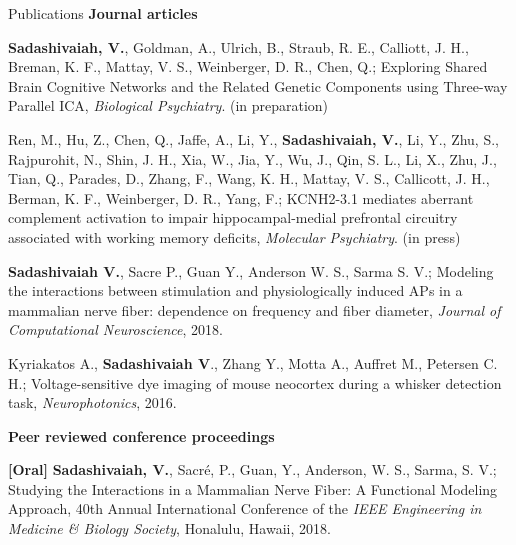 \documentclass{resume}
\begin{document}
\vspace{1em} 
\begin{rSection}{Publications}
\textbf{\Large Journal articles}
\begin{publications}
 
\item \textbf{Sadashivaiah, V.}, Goldman, A., Ulrich, B., Straub, R. E., Calliott, J. H., Breman, K. F., Mattay, V. S., Weinberger, D. R., Chen, Q.; Exploring Shared Brain Cognitive Networks and the Related Genetic Components using Three-way Parallel ICA, \textit{Biological Psychiatry}. (in preparation) 

\item Ren, M., Hu, Z., Chen, Q., Jaffe, A., Li, Y., \textbf{Sadashivaiah, V.}, Li, Y., Zhu, S., Rajpurohit, N., Shin, J. H., Xia, W., Jia, Y., Wu, J., Qin, S. L., Li, X., Zhu, J., Tian, Q., Parades, D., Zhang, F., Wang, K. H., Mattay, V. S., Callicott, J. H., Berman, K. F., Weinberger, D. R., Yang, F.; KCNH2-3.1 mediates aberrant complement activation to impair hippocampal-medial prefrontal circuitry associated with working memory deficits, \textit{Molecular Psychiatry}. (in press)

\item \textbf{Sadashivaiah V.}, Sacre P., Guan Y., Anderson W. S., Sarma S. V.; Modeling the interactions between stimulation and physiologically induced APs in a mammalian nerve fiber: dependence on frequency and fiber diameter, \textit{Journal of Computational Neuroscience}, 2018.

\item Kyriakatos A., \textbf{Sadashivaiah V}., Zhang Y., Motta A., Auffret M., Petersen C. H.; Voltage-sensitive dye imaging of mouse neocortex during a whisker detection task, \textit{Neurophotonics}, 2016.

\end{publications}

\textbf{\Large Peer reviewed conference proceedings}
\begin{conferences}

\item \textbf{[Oral]} \textbf{Sadashivaiah, V.}, Sacré, P., Guan, Y., Anderson, W. S., Sarma, S. V.; Studying the Interactions in a Mammalian Nerve Fiber: A Functional Modeling Approach, 40th Annual International Conference of the \textit{IEEE Engineering in Medicine \& Biology Society}, Honalulu, Hawaii, 2018.


\end{conferences}
\end{rSection}
\end{document}
